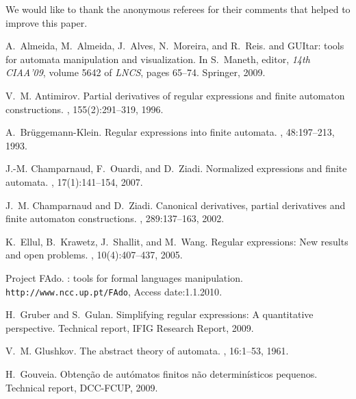 \documentclass{llncs}
\begin{document}
We would like to thank the anonymous referees for their
comments that helped to improve this paper.  

\newcommand{\etalchar}[1]{$^{#1}$}
\begin{thebibliography}{EKSW05}

\bibitem[AAA{\etalchar{+}}09]{almeida09:_fado_guitar_c}
A.~Almeida, M.~Almeida, J.~Alves, N.~Moreira, and R.~Reis.
 and {GUItar}: tools for automata manipulation and
  visualization.
\newblock In S.~Maneth, editor, {\em 14th CIAA'09}, volume 5642 of {\em LNCS},
  pages 65--74. Springer, 2009.

V.~M. Antimirov.
\newblock Partial derivatives of regular expressions and finite automaton
  constructions.
, 155(2):291--319, 1996.

A.~Br\"{u}ggemann-Klein.
\newblock Regular expressions into finite automata.
, 48:197--213, 1993.

J.-M. Champarnaud, F.~Ouardi, and D.~Ziadi.
\newblock Normalized expressions and finite automata.
, 17(1):141--154, 2007.

J.~M. Champarnaud and D.~Ziadi.
\newblock Canonical derivatives, partial derivatives and finite automaton
  constructions.
, 289:137--163, 2002.

K.~Ellul, B.~Krawetz, J.~Shallit, and M.~Wang.
\newblock Regular expressions: New results and open problems.
, 10(4):407--437, 2005.

Project FAdo.
: tools for formal languages manipulation.
\newblock \texttt{http://www.ncc.up.pt/FAdo}, {Access date:1.1.2010}.

H.~Gruber and S.~Gulan.
\newblock Simplifying regular expressions: A quantitative perspective.
\newblock Technical report, IFIG Research Report, 2009.

V.~M. Glushkov.
\newblock The abstract theory of automata.
, 16:1--53, 1961.

H.~Gouveia.
\newblock Obtenção de autómatos finitos não determinísticos pequenos.
\newblock Technical report, DCC-FCUP, 2009.


\end{thebibliography}
\end{document}
